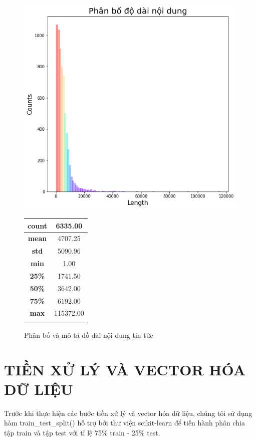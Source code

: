 \documentclass[12pt,a4paper,oneside]{book}
\begin{document}
	  \begin{figure}[!ht]
	  	
	    \centering
	    \includegraphics[width=0.71\columnwidth]{textlen}
	    \qquad
	    \footnotesize
	    \renewcommand{\arraystretch}{2.}
	    \begin{tabular}[b]{cc}\hline
	      \textbf{count} &  6335.00\\ \hline
          \textbf{mean} & 4707.25 \\ \hline
          \textbf{std} & 5090.96 \\ \hline
          \textbf{min} & 1.00 \\ \hline
          \textbf{25\%} & 1741.50 \\ \hline
          \textbf{50\%} & 3642.00 \\ \hline
          \textbf{75\%}  & 6192.00\\ \hline
          \textbf{max} & 115372.00\\ \hline 
          \vspace{2.5em} 
	    \end{tabular}
	    \caption{Phân bố và mô tả đồ dài nội dung tin tức}
	  \end{figure}
	
	
	
	  
	  
	  
	  
	  
	

\chapter{TIỀN XỬ LÝ VÀ VECTOR HÓA DỮ LIỆU}
	
	Trước khi thực hiện các bước tiền xử lý và vector hóa dữ liệu, chúng tôi sử dụng hàm train\_test\_split() hỗ trợ bởi thư viện scikit-learn để tiến hành phân chia tập train và tập test với tỉ lệ 75\% train - 25\% test. 
	
\end{document}

